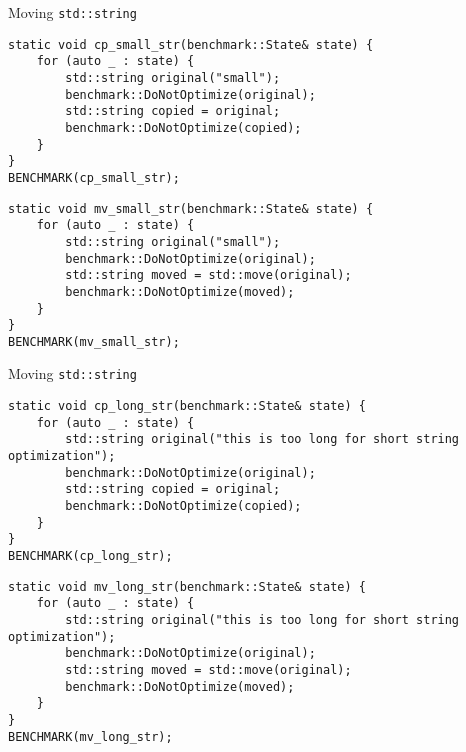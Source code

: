\begin{frame}[fragile]{Moving \texttt{std::string}}
    \centering

    \begin{lstlisting}
static void cp_small_str(benchmark::State& state) {
    for (auto _ : state) {
        std::string original("small");
        benchmark::DoNotOptimize(original);
        std::string copied = original;
        benchmark::DoNotOptimize(copied);
    }
}
BENCHMARK(cp_small_str);
    \end{lstlisting}

    \begin{lstlisting}
static void mv_small_str(benchmark::State& state) {
    for (auto _ : state) {
        std::string original("small");
        benchmark::DoNotOptimize(original);
        std::string moved = std::move(original);
        benchmark::DoNotOptimize(moved);
    }
}
BENCHMARK(mv_small_str);
    \end{lstlisting}
\end{frame}

\begin{frame}[fragile]{Moving \texttt{std::string}}
    \centering

    \begin{lstlisting}
static void cp_long_str(benchmark::State& state) {
    for (auto _ : state) {
        std::string original("this is too long for short string optimization");
        benchmark::DoNotOptimize(original);
        std::string copied = original;
        benchmark::DoNotOptimize(copied);
    }
}
BENCHMARK(cp_long_str);
    \end{lstlisting}

    \begin{lstlisting}
static void mv_long_str(benchmark::State& state) {
    for (auto _ : state) {
        std::string original("this is too long for short string optimization");
        benchmark::DoNotOptimize(original);
        std::string moved = std::move(original);
        benchmark::DoNotOptimize(moved);
    }
}
BENCHMARK(mv_long_str);
    \end{lstlisting}
\end{frame}

